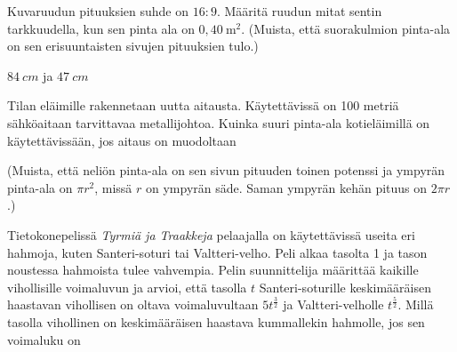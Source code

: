 \begin{tehtavasivu}
\begin{tehtava}%
Kuvaruudun pituuksien suhde on $16:9$. Määritä ruudun mitat sentin tarkkuudella, kun sen pinta ala on \(0,40\ \mathrm{m}^2\). (Muista, että suorakulmion pinta-ala on sen erisuuntaisten sivujen pituuksien tulo.)
\begin{vastaus}
$84\ cm$ ja $47\ cm$
\end{vastaus}
\end{tehtava}

\begin{tehtava}%
Tilan eläimille rakennetaan uutta aitausta. Käytettävissä on 100 metriä sähköaitaan tarvittavaa metallijohtoa. Kuinka suuri pinta-ala kotieläimillä on käytettävissään, jos aitaus on muodoltaan
\begin{alakohdat}
\end{alakohdat}
(Muista, että neliön pinta-ala on sen sivun pituuden toinen potenssi ja ympyrän pinta-ala on \(\pi r^2\), missä \(r\) on ympyrän säde. Saman ympyrän kehän pituus on \(2\pi r\).)
\begin{vastaus}
\begin{alakohdat}
\end{alakohdat}
\end{vastaus}
\end{tehtava}

\begin{tehtava}
Tietokonepelissä \emph{Tyrmiä ja Traakkeja} pelaajalla on käytettävissä useita eri hahmoja,
kuten Santeri-soturi tai Valtteri-velho. Peli alkaa tasolta 1 ja tason noustessa hahmoista
tulee vahvempia. Pelin suunnittelija määrittää kaikille vihollisille voimaluvun ja arvioi,
että tasolla $t$ Santeri-soturille keskimääräisen haastavan vihollisen on oltava
voimaluvultaan $5t^{\frac{3}{2}}$ ja Valtteri-velholle $t^{\frac{5}{2}}$. Millä tasolla
vihollinen on keskimääräisen haastava kummallekin hahmolle, jos sen voimaluku on
\begin{alakohdat}
\end{alakohdat}
\begin{vastaus}
\begin{alakohdat}
\end{alakohdat}
\end{vastaus}
\end{tehtava}

\end{tehtavasivu}
